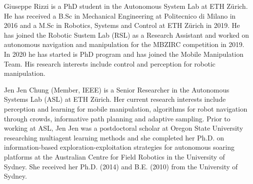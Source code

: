 \documentclass[journal]{IEEEtran}  %
\begin{document}

\begin{IEEEbiography}{Giuseppe Rizzi}
is a PhD student in the Autonomous System Lab at ETH Zürich. He has received a B.Sc in Mechanical Engineering at Politecnico di Milano in 2016 and a M.Sc in Robotics, Systems and Control at ETH Zürich in 2019. He has joined the Robotic Sustem Lab (RSL) as a Research Assistant and worked on autonomous navigation and manipulation for the MBZIRC competition in 2019. In 2020 he has started is PhD program and has joined the Mobile Manipulation Team. His research interests include control and perception for robotic manipulation.  
\end{IEEEbiography}

\begin{IEEEbiography}{Jen Jen Chung}
(Member, IEEE) is a Senior Researcher in the Autonomous Systems Lab (ASL) at ETH Zürich. Her current research interests include perception and learning for mobile manipulation, algorithms for robot navigation through crowds, informative path planning and adaptive sampling. Prior to working at ASL, Jen Jen was a postdoctoral scholar at Oregon State University researching multiagent learning methods and she completed her Ph.D. on information-based exploration-exploitation strategies for autonomous soaring platforms at the Australian Centre for Field Robotics in the University of Sydney. She received her Ph.D. (2014) and B.E. (2010) from the University of Sydney.
\end{IEEEbiography}
\end{document}
